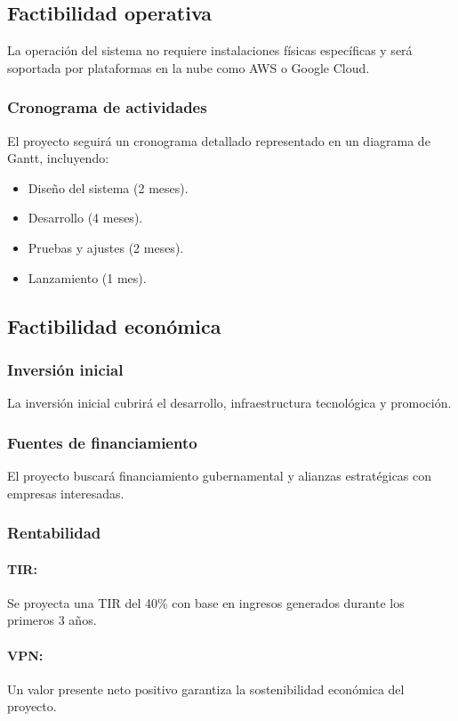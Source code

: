 \documentclass[a4paper,12pt]{article}
\begin{document}
\subsection{Factibilidad operativa}
La operación del sistema no requiere instalaciones físicas específicas y será soportada por plataformas en la nube como AWS o Google Cloud.

\subsubsection{Cronograma de actividades}
El proyecto seguirá un cronograma detallado representado en un diagrama de Gantt, incluyendo:
\begin{itemize}
    \item Diseño del sistema (2 meses).
    \item Desarrollo (4 meses).
    \item Pruebas y ajustes (2 meses).
    \item Lanzamiento (1 mes).
\end{itemize}

\subsection{Factibilidad económica}
\subsubsection{Inversión inicial}
La inversión inicial cubrirá el desarrollo, infraestructura tecnológica y promoción.

\subsubsection{Fuentes de financiamiento}
El proyecto buscará financiamiento gubernamental y alianzas estratégicas con empresas interesadas.

\subsubsection{Rentabilidad}
\paragraph{TIR:} Se proyecta una TIR del 40\% con base en ingresos generados durante los primeros 3 años.  
\paragraph{VPN:} Un valor presente neto positivo garantiza la sostenibilidad económica del proyecto.  
\end{document}
